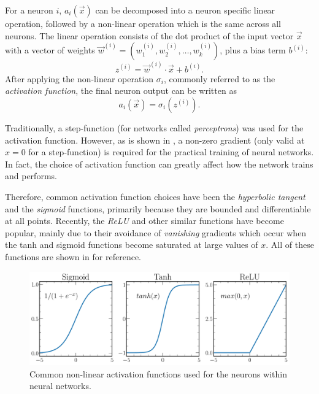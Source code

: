 For a neuron $i$, $a_{i}(\vec{x})$ can be decomposed into a neuron specific linear operation,
followed by a non-linear operation which is the same across all neurons. The linear operation
consists of the dot product of the input vector $\vec{x}$ with a vector of weights
$\vec{w}^{(i)}=(w_{1}^{(i)}, w_{2}^{(i)},\dots,w_{k}^{(i)})$, plus a bias term $b^{(i)}$:
\begin{equation} %
    z^{(i)}=\vec{w}^{(i)}\cdot\vec{x}+b^{(i)}.
    \label{eq:network}
\end{equation}
After applying the non-linear operation $\sigma_{i}$, commonly referred to as the \emph{activation
    function}, the final neuron output can be written as
\begin{equation} %
    a_{i}(\vec{x})=\sigma_{i}(z^{(i)}).
    \label{eq:activation}
\end{equation}

Traditionally, a step-function (for networks called \emph{perceptrons}) was used for the
activation function. However, as is shown in , a non-zero
gradient (only valid at $x=0$ for a step-function) is required for the practical training of
neural networks. In fact, the choice of activation function can greatly affect how the network
trains and performs.

Therefore, common activation function choices have been the \emph{hyperbolic tangent} and the
\emph{sigmoid} functions, primarily because they are bounded and differentiable at all points.
Recently, the \emph{ReLU} and other similar functions have become popular, mainly due to their
avoidance of \emph{vanishing} gradients which occur when the tanh and sigmoid functions become
saturated at large values of $x$. All of these functions are shown in 
for reference.

\begin{figure} %
    \includegraphics[width=\textwidth]{diagrams/6-cnn/activations.pdf}
    \caption[Common non-linear activation functions]
    {Common non-linear activation functions used for the neurons within neural networks.}
    \label{fig:activations}
\end{figure}

